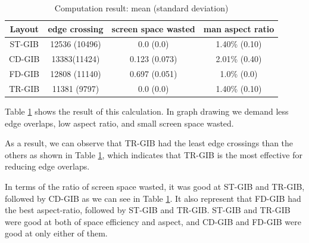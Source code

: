 \documentclass{llncs}
\begin{document}
\begin{table}[htb]
  \begin{center}
    \begin{tabular}{|c||c|c|c|} \hline
      Layout & edge crossing & screen space wasted & man aspect ratio \\ \hline \hline
      ST-GIB & 12536 (10496) & 0.0 (0.0) & 1.40\% (0.10) \\ \hline
      CD-GIB & 13383(11424) & 0.123 (0.073) & 2.01\% (0.40)\\ \hline
      FD-GIB & 12808 (11140) & 0.697 (0.051) & 1.0\% (0.0)\\ \hline
      TR-GIB & 11381 (9797) & 0.0 (0.0) & 1.40\% (0.10)\\ \hline
    \end{tabular}
  \end{center}
  \caption{Computation result: mean (standard deviation)}
  \label{comp-result}
\end{table}

Table \ref{comp-result} shows the result of this calculation.
In graph drawing we demand less edge overlaps, low aspect ratio, and small screen space wasted.

As a result, we can observe that TR-GIB had the least edge crossings than the others as shown in Table \ref{comp-result}, which indicates that TR-GIB is the most effective for reducing edge overlaps.

In terms of the ratio of screen space wasted, it was good at ST-GIB and TR-GIB, followed by CD-GIB as we can see in Table \ref{comp-result}.
It also represent that FD-GIB had the best aspect-ratio, followed by ST-GIB and TR-GIB.
ST-GIB and TR-GIB were good at both of space efficiency and aspect, and CD-GIB and FD-GIB were good at only either of them.

\end{document}
